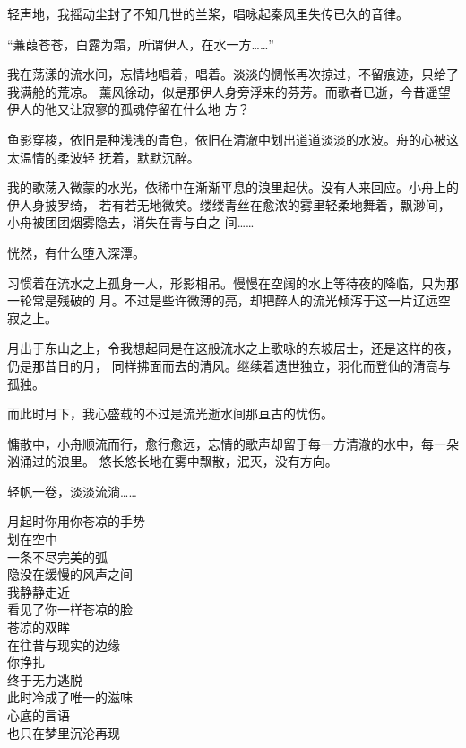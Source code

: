 		轻声地，我摇动尘封了不知几世的兰桨，唱咏起秦风里失传已久的音律。

		“蒹葭苍苍，白露为霜，所谓伊人，在水一方……”

		我在荡漾的流水间，忘情地唱着，唱着。淡淡的惆怅再次掠过，不留痕迹，只给了我满舱的荒凉。
	薰风徐动，似是那伊人身旁浮来的芬芳。而歌者已逝，今昔遥望伊人的他又让寂寥的孤魂停留在什么地
	方？

		鱼影穿梭，依旧是种浅浅的青色，依旧在清澈中划出道道淡淡的水波。舟的心被这太温情的柔波轻
	抚着，默默沉醉。

		我的歌荡入微蒙的水光，依稀中在渐渐平息的浪里起伏。没有人来回应。小舟上的伊人身披罗绮，
	若有若无地微笑。缕缕青丝在愈浓的雾里轻柔地舞着，飘渺间，小舟被团团烟雾隐去，消失在青与白之
	间……

		恍然，有什么堕入深潭。

		习惯着在流水之上孤身一人，形影相吊。慢慢在空阔的水上等待夜的降临，只为那一轮常是残破的
	月。不过是些许微薄的亮，却把醉人的流光倾泻于这一片辽远空寂之上。

		月出于东山之上，令我想起同是在这般流水之上歌咏的东坡居士，还是这样的夜，仍是那昔日的月，
	同样拂面而去的清风。继续着遗世独立，羽化而登仙的清高与孤独。

		而此时月下，我心盛载的不过是流光逝水间那亘古的忧伤。

		慵散中，小舟顺流而行，愈行愈远，忘情的歌声却留于每一方清澈的水中，每一朵汹涌过的浪里。
	悠长悠长地在雾中飘散，泯灭，没有方向。

		轻帆一卷，淡淡流淌……

	\endwriting



		\longpoem{}{}{}
			月起时你用你苍凉的手势 \\
			划在空中 \\
			一条不尽完美的弧 \\
			隐没在缓慢的风声之间 \\
			我静静走近 \\
			看见了你一样苍凉的脸 \\
			苍凉的双眸 \\
			在往昔与现实的边缘 \\
			你挣扎 \\
			终于无力逃脱 \\
			此时冷成了唯一的滋味 \\
			心底的言语 \\
			也只在梦里沉沦再现
		\endlongpoem
	\endwriting



